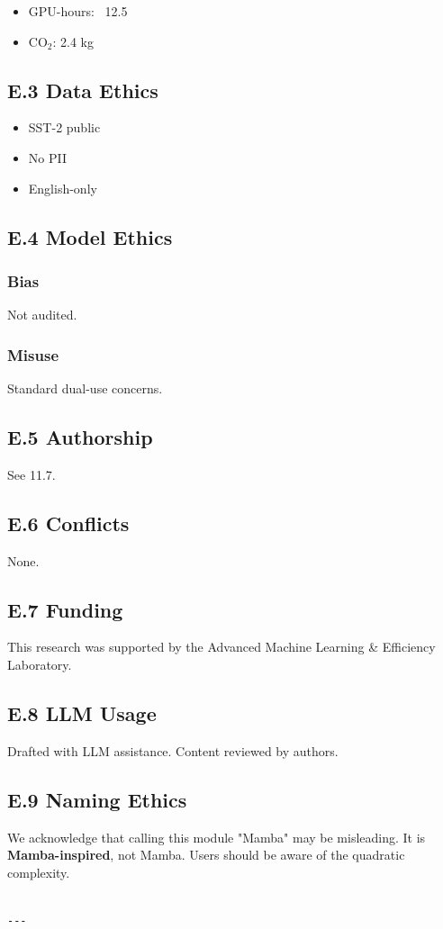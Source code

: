\begin{itemize}
\item GPU-hours: ~12.5
\item CO$_2$: 2.4 kg

\end{itemize}
\subsection{E.3 Data Ethics}

\begin{itemize}
\item SST-2 public
\item No PII
\item English-only

\end{itemize}
\subsection{E.4 Model Ethics}

\subsubsection{Bias}
Not audited.

\subsubsection{Misuse}
Standard dual-use concerns.

\subsection{E.5 Authorship}

See  11.7.

\subsection{E.6 Conflicts}

None.

\subsection{E.7 Funding}

This research was supported by the Advanced Machine Learning \& Efficiency Laboratory.

\subsection{E.8 LLM Usage}

Drafted with LLM assistance. Content reviewed by authors.

\subsection{E.9 Naming Ethics}

We acknowledge that calling this module "Mamba" may be misleading. It is 
\textbf{Mamba-inspired}, not Mamba. Users should be aware of the quadratic 
complexity.
\begin{lstlisting}

---
\end{lstlisting}